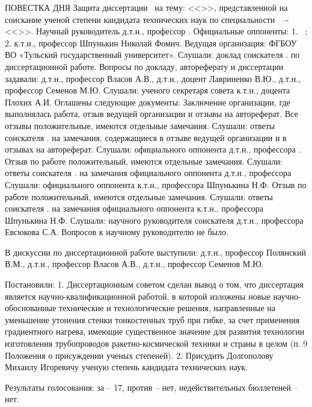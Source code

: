 ПОВЕСТКА ДНЯ
Защита диссертации \thesisAuthorLastNameFromFull\ на тему: <<\thesisTitle>>, представленной на соискание ученой степени кандидата технических наук по специальности \thesisSpecialtyNumber\ –- <<\thesisSpecialtyTitle>>.
Научный руководитель д.т.н., профессор \supervisorFioShort.
Официальные оппоненты:
1. \opponentOneRegalia\ \opponentOneFio;
2. к.т.н., профессор Шпунькин Николай Фомич.
Ведущая организация: ФГБОУ ВО «Тульский государственный университет».
Слушали: доклад соискателя \thesisAuthorLastNameFrom. по диссертационной работе.
Вопросы по докладу, автореферату и диссертации задавали: 
д.т.н., профессор Власов А.В., д.т.н., доцент Лавриненко В.Ю., д.т.н., профессор Семенов М.Ю.
Слушали: ученого секретаря совета к.т.н., доцента Плохих А.И.
Оглашены следующие документы:
Заключение организации, где выполнялась работа, отзыв ведущей организации и отзывы на автореферат. Все отзывы положительные, имеются отдельные замечания.
Слушали: ответы соискателя \thesisAuthorLastNameFrom. на замечания, содержащиеся в отзыве ведущей организации и в отзывах на автореферат.
Слушали: официального оппонента д.т.н., профессора \opponentOneWhomFioShort. Отзыв по работе положительный, имеются отдельные замечания.
Слушали: ответы соискателя \thesisAuthorLastNameFrom. на замечания официального оппонента д.т.н., профессора \opponentOneWhomFioShort
Слушали: официального оппонента к.т.н., профессора Шпунькина Н.Ф. Отзыв по работе положительный, имеются отдельные замечания.
Слушали: ответы соискателя \thesisAuthorLastNameFrom. на замечания официального оппонента к.т.н., профессора Шпунькина Н.Ф.
Слушали: научного руководителя соискателя д.т.н., профессора Евсюкова С.А.
Вопросов к научному руководителю не было.

В дискуссии по диссертационной работе выступили: 
д.т.н., профессор Полянский В.М., д.т.н., профессор Власов А.В., д.т.н., профессор Семенов М.Ю.

Постановили:
1.	Диссертационным советом сделан вывод о том, что диссертация является научно-квалификационной работой, в которой изложены новые научно-обоснованные технические и технологические решения, направленные на уменьшение утонения стенки тонкостенных труб при гибке, за счет применения градиентного нагрева, имеющие существенное значение для развития технологии изготовления трубопроводов ракетно-космической техники и страны в целом (п. 9 Положения 
о присуждении ученых степеней).
2.	Присудить Долгополову Михаилу Игоревичу ученую степень кандидата технических наук.

Результаты голосования: за – 17, против – нет, недействительных бюллетеней – нет.



